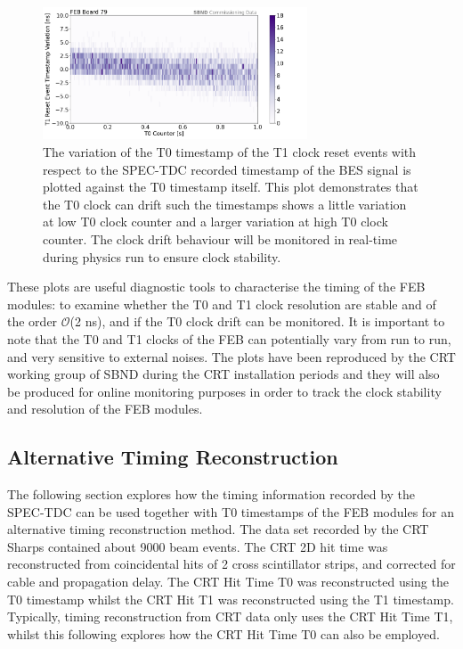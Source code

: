 \begin{figure}[htbp!] 
\centering    
\includegraphics[width=0.70\textwidth]{board79_T1drift_2d}
\caption[board79_T1drift_2d]{
The variation of the T0 timestamp of the T1 clock reset events with respect to the SPEC-TDC recorded timestamp of the BES signal is plotted against the T0 timestamp itself.
This plot demonstrates that the T0 clock can drift such the timestamps shows a little variation at low T0 clock counter and a larger variation at high T0 clock counter.
The clock drift behaviour will be monitored in real-time during physics run to ensure clock stability.
}
\label{fig:board79_T1drift_2d}
\end{figure}

These plots are useful diagnostic tools to characterise the timing of the FEB modules: to examine whether the T0 and T1 clock resolution are stable and of the order $\mathcal{O}$(2 ns), and if the T0 clock drift can be monitored.
It is important to note that the T0 and T1 clocks of the FEB can potentially vary from run to run, and very sensitive to external noises. 
The plots have been reproduced by the CRT working group of SBND during the CRT installation periods and they will also be produced for online monitoring purposes in order to track the clock stability and resolution of the FEB modules.

\subsection{Alternative Timing Reconstruction}

The following section explores how the timing information recorded by the SPEC-TDC can be used together with T0 timestamps of the FEB modules for an alternative timing reconstruction method.
The data set recorded by the CRT Sharps contained about 9000 beam events. 
The CRT 2D hit time was reconstructed from coincidental hits of 2 cross scintillator strips, and corrected for cable and propagation delay.
The CRT Hit Time T0 was reconstructed using the T0 timestamp whilst the CRT Hit T1 was reconstructed using the T1 timestamp. 
Typically, timing reconstruction from CRT data only uses the CRT Hit Time T1, whilst this following explores how the CRT Hit Time T0 can also be employed.

